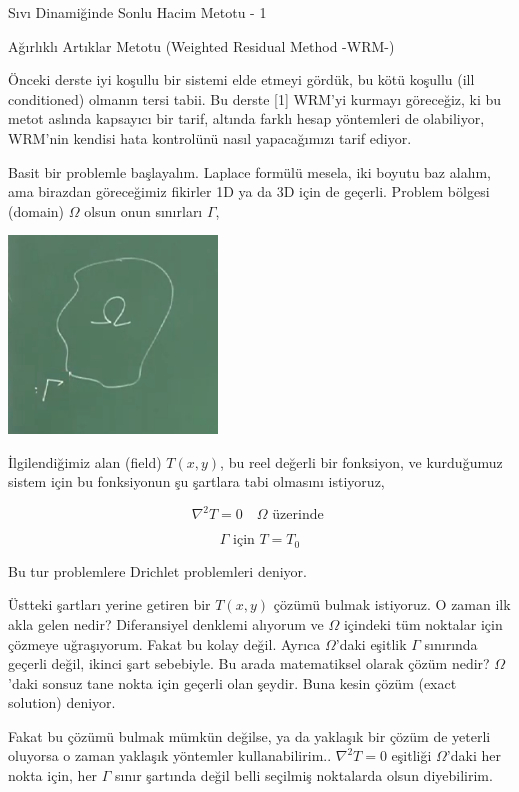 \documentclass[12pt,fleqn]{article}\usepackage{../../common}
\begin{document}
Sıvı Dinamiğinde Sonlu Hacim Metotu - 1

Ağırlıklı Artıklar Metotu (Weighted Residual Method -WRM-)

Önceki derste iyi koşullu bir sistemi elde etmeyi gördük, bu kötü koşullu (ill
conditioned) olmanın tersi tabii. Bu derste [1] WRM'yi kurmayı göreceğiz, ki bu
metot aslında kapsayıcı bir tarif, altında farklı hesap yöntemleri de
olabiliyor, WRM'nin kendisi hata kontrolünü nasıl yapacağımızı tarif ediyor.

Basit bir problemle başlayalım. Laplace formülü mesela, iki boyutu baz alalım,
ama birazdan göreceğimiz fikirler 1D ya da 3D için de geçerli. Problem bölgesi
(domain) $\Omega$ olsun onun sınırları $\Gamma$, 

\includegraphics[width=15em]{compscieng_app45aerofem1_01.png}

İlgilendiğimiz alan (field) $T(x,y)$, bu reel değerli bir fonksiyon, ve
kurduğumuz sistem için bu fonksiyonun şu şartlara tabi olmasını istiyoruz,

$$
\nabla^2 T = 0 \quad \Omega \textrm{ üzerinde } 
$$

$$
\Gamma \textrm{ için } T = T_0
$$

Bu tur problemlere Drichlet problemleri deniyor.

Üstteki şartları yerine getiren bir $T(x,y)$ çözümü bulmak istiyoruz. O zaman
ilk akla gelen nedir? Diferansiyel denklemi alıyorum ve $\Omega$ içindeki tüm
noktalar için çözmeye uğraşıyorum. Fakat bu kolay değil. Ayrıca $\Omega$'daki
eşitlik $\Gamma$ sınırında geçerli değil, ikinci şart sebebiyle. Bu arada
matematiksel olarak çözüm nedir? $\Omega$'daki sonsuz tane nokta için geçerli
olan şeydir. Buna kesin çözüm (exact solution) deniyor. 

Fakat bu çözümü bulmak mümkün değilse, ya da yaklaşık bir çözüm de yeterli
oluyorsa o zaman yaklaşık yöntemler kullanabilirim.. $\nabla^2 T = 0 $ eşitliği
$\Omega$'daki her nokta için, her $\Gamma$ sınır şartında değil belli seçilmiş
noktalarda olsun diyebilirim.
\end{document}
